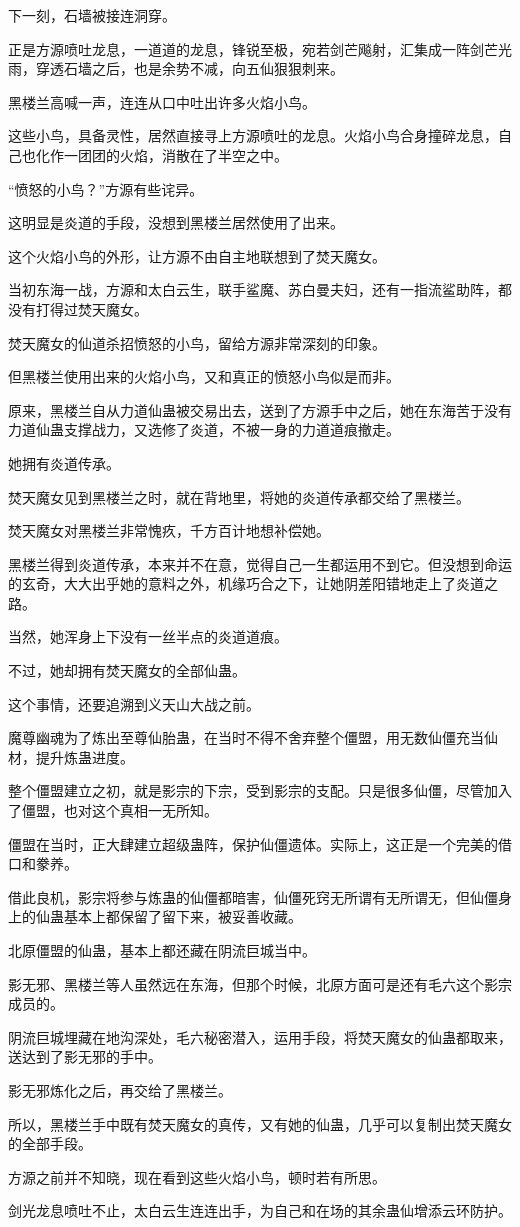 \begin{this_body}
下一刻，石墙被接连洞穿。

正是方源喷吐龙息，一道道的龙息，锋锐至极，宛若剑芒飚射，汇集成一阵剑芒光雨，穿透石墙之后，也是余势不减，向五仙狠狠刺来。

黑楼兰高喊一声，连连从口中吐出许多火焰小鸟。

这些小鸟，具备灵性，居然直接寻上方源喷吐的龙息。火焰小鸟合身撞碎龙息，自己也化作一团团的火焰，消散在了半空之中。

“愤怒的小鸟？”方源有些诧异。

这明显是炎道的手段，没想到黑楼兰居然使用了出来。

这个火焰小鸟的外形，让方源不由自主地联想到了焚天魔女。

当初东海一战，方源和太白云生，联手鲨魔、苏白曼夫妇，还有一指流鲨助阵，都没有打得过焚天魔女。

焚天魔女的仙道杀招愤怒的小鸟，留给方源非常深刻的印象。

但黑楼兰使用出来的火焰小鸟，又和真正的愤怒小鸟似是而非。

原来，黑楼兰自从力道仙蛊被交易出去，送到了方源手中之后，她在东海苦于没有力道仙蛊支撑战力，又选修了炎道，不被一身的力道道痕撤走。

她拥有炎道传承。

焚天魔女见到黑楼兰之时，就在背地里，将她的炎道传承都交给了黑楼兰。

焚天魔女对黑楼兰非常愧疚，千方百计地想补偿她。

黑楼兰得到炎道传承，本来并不在意，觉得自己一生都运用不到它。但没想到命运的玄奇，大大出乎她的意料之外，机缘巧合之下，让她阴差阳错地走上了炎道之路。

当然，她浑身上下没有一丝半点的炎道道痕。

不过，她却拥有焚天魔女的全部仙蛊。

这个事情，还要追溯到义天山大战之前。

魔尊幽魂为了炼出至尊仙胎蛊，在当时不得不舍弃整个僵盟，用无数仙僵充当仙材，提升炼蛊进度。

整个僵盟建立之初，就是影宗的下宗，受到影宗的支配。只是很多仙僵，尽管加入了僵盟，也对这个真相一无所知。

僵盟在当时，正大肆建立超级蛊阵，保护仙僵遗体。实际上，这正是一个完美的借口和豢养。

借此良机，影宗将参与炼蛊的仙僵都暗害，仙僵死窍无所谓有无所谓无，但仙僵身上的仙蛊基本上都保留了留下来，被妥善收藏。

北原僵盟的仙蛊，基本上都还藏在阴流巨城当中。

影无邪、黑楼兰等人虽然远在东海，但那个时候，北原方面可是还有毛六这个影宗成员的。

阴流巨城埋藏在地沟深处，毛六秘密潜入，运用手段，将焚天魔女的仙蛊都取来，送达到了影无邪的手中。

影无邪炼化之后，再交给了黑楼兰。

所以，黑楼兰手中既有焚天魔女的真传，又有她的仙蛊，几乎可以复制出焚天魔女的全部手段。

方源之前并不知晓，现在看到这些火焰小鸟，顿时若有所思。

剑光龙息喷吐不止，太白云生连连出手，为自己和在场的其余蛊仙增添云环防护。

\end{this_body}

